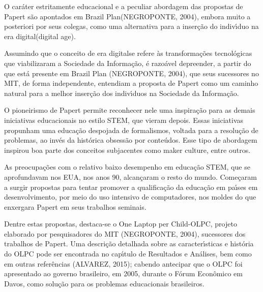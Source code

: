 \documentclass[
12pt,		%
openright,	%
twoside,  %
a4paper,			%
chapter=TITLE,		%
english,			%
french,				%
spanish,			%
brazil				%
]{USPSC-classe/USPSC}
\begin{document}
O car\'ater estritamente educacional e a peculiar abordagem das propostas de Papert s\~ao apontados em \textquotedbl Brazil Plan\textquotedbl  (NEGROPONTE, 2004), embora muito a posteriori por seus colegas, como uma alternativa para a inser\c{c}\~ao do indiv\'{\i}duo na \textquotedbl era digital\textquotedbl  (digital age).









Assumindo que o conceito de \textquotedbl era digital\textquotedbl  se refere \`as transforma\c{c}\~oes tecnol\'ogicas que viabilizaram a \textquotedbl Sociedade da Informa\c{c}\~ao\textquotedbl ,  \'e razo\'avel depreender, a partir do que est\'a presente em Brazil Plan  (NEGROPONTE, 2004), que seus sucessores no MIT, de forma independente, entendiam a proposta de Papert como um caminho natural para a melhor inser\c{c}\~ao dos indiv\'{\i}duos na Sociedade da Informa\c{c}\~ao.









O pioneirismo de Papert permite reconhecer nele uma inspira\c{c}\~ao para as demais iniciativas educacionais no estilo STEM, que vieram depois. Essas iniciativas propunham uma educa\c{c}\~ao despojada de formalismos, voltada para a resolu\c{c}\~ao de problemas, ao inv\'es da hist\'orica obsess\~ao por conte\'udos. Esse tipo de abordagem inspirou boa parte dos conceitos subjacentes como \textquotedbl maker culture\textquotedbl , entre outros.









As preocupa\c{c}\~oes com o relativo baixo desempenho em  educa\c{c}\~ao STEM, que se aprofundavam nos EUA, nos anos 90, alcan\c{c}aram o resto do mundo. Come\c{c}aram a surgir propostas para tentar promover a qualifica\c{c}\~ao da educa\c{c}\~ao em pa\'{\i}ses em desenvolvimento, por meio do uso intensivo de computadores, nos moldes do que enxergara Papert em seus trabalhos seminais.









Dentre estas propostas, destaca-se o \textquotedbl One Laptop per Child-OLPC\textquotedbl , projeto elaborado por pesquisadores do MIT  (NEGROPONTE, 2004), sucessores dos trabalhos de Papert. Uma descri\c{c}\~ao detalhada sobre as caracter\'{\i}sticas e hist\'oria do OLPC pode ser encontrada no cap\'{\i}tulo de Resultados e An\'alises, bem como em outras refer\^encias (ALVAREZ, 2015); cabendo antecipar que o OLPC foi apresentado ao governo brasileiro, em 2005, durante o F\'orum Econ\^omico em Davos, como solu\c{c}\~ao para os problemas educacionais brasileiros.
\end{document}
